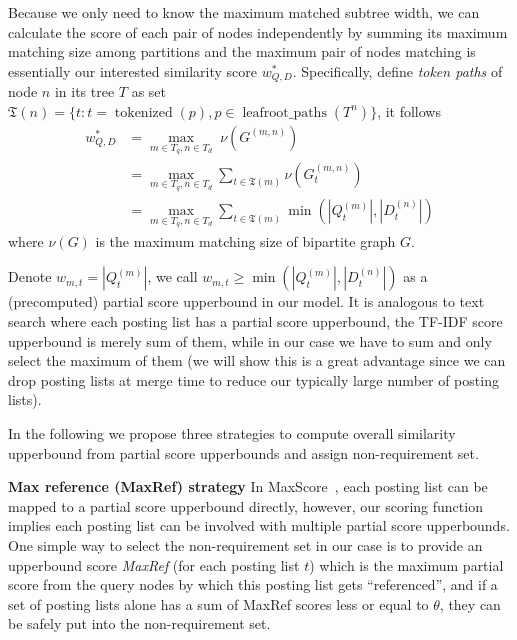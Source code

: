 \documentclass[runningheads]{llncs}
\begin{document}
Because we only need to know the maximum matched subtree width, we can calculate the score of each pair of nodes independently by summing its maximum matching size among partitions and the maximum pair of nodes matching is essentially our interested similarity score $w^*_{Q, D}$.
Specifically,
%
define \textit{token paths} of node $n$ in its tree $T$ as set $\mathfrak{T}(n) = \{t: t = \operatorname{tokenized}(p), p \in \operatorname{leafroot\_paths}(T^n) \}$, it follows
\begin{align}
w^*_{Q, D} &= \max_{m \in T_q, n \in T_d} \; \nu(G^{(m, n)}) \\
           &= \max_{m \in T_q, n \in T_d} \sum_{t \in \mathfrak{T}(m)} \nu(G^{(m, n)}_t) \\
		   \label{eq:5}
           &= \max_{m \in T_q, n \in T_d} \sum_{t \in \mathfrak{T}(m)} \min(|Q^{(m)}_t|, |D^{(n)}_t|)
\end{align}
where $\nu(G)$ is the maximum matching size of bipartite graph $G$.

%
Denote $w_{m, t} = |Q^{(m)}_t|$, we call $w_{m, t} \ge \min(|Q^{(m)}_t|, |D^{(n)}_t|)$ as a (precomputed) partial score upperbound in our model.
It is analogous to text search where each posting list has a partial score upperbound, the TF-IDF score upperbound is merely sum of them, while in our case we have to sum and only select the maximum of them (we will show this is a great advantage since we can drop posting lists at merge time to reduce our typically large number of posting lists).

In the following we propose three strategies to compute overall similarity upperbound from partial score upperbounds and assign non-requirement set.

\vspace{0.1in}
\noindent \textbf{Max reference (MaxRef) strategy}\;
In MaxScore~\cite{turtle_flood_1995, strohman_turtle_2005}, each posting list can be mapped to a partial score upperbound directly, however, our scoring function implies each posting list can be involved with multiple partial score upperbounds.
One simple way to select the non-requirement set in our case is to provide an upperbound score \emph{MaxRef} (for each posting list $t$) which is the maximum partial score from the query nodes by which this posting list gets ``referenced'', and if a set of posting lists alone has a sum of MaxRef scores less or equal to $\theta$, they can be safely put into the non-requirement set.
\end{document}
